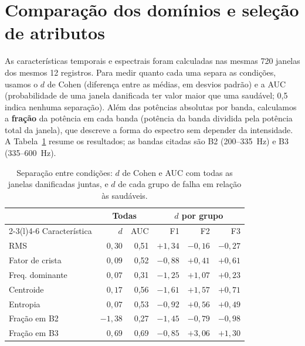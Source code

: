 
\section{Comparação dos domínios e seleção de atributos}
As características temporais e espectrais foram calculadas nas mesmas 720 janelas dos mesmos 12 registros. Para medir quanto cada uma separa as condições, usamos o $d$ de Cohen (diferença entre as médias, em desvios padrão) e a AUC (probabilidade de uma janela danificada ter valor maior que uma saudável; 0,5 indica nenhuma separação). Além das potências absolutas por banda, calculamos a \textbf{fração} da potência em cada banda (potência da banda dividida pela potência total da janela), que descreve a forma do espectro sem depender da intensidade. A Tabela~\ref{tab:comp} resume os resultados; as bandas citadas são B2 (200--335~Hz) e B3 (335--600~Hz).

\begin{table}[!t]
\caption{Separação entre condições: $d$ de Cohen e AUC com todas as janelas danificadas juntas, e $d$ de cada grupo de falha em relação às saudáveis.}
\label{tab:comp}\centering\small\setlength{\tabcolsep}{3.5pt}
\begin{tabular}{@{}lrrrrr@{}}\toprule
 & \multicolumn{2}{c}{Todas} & \multicolumn{3}{c}{$d$ por grupo}\\\cmidrule(lr){2-3}\cmidrule(l){4-6}
Característica & $d$ & AUC & F1 & F2 & F3\\\midrule
RMS & $0{,}30$ & 0,51 & $+1{,}34$ & $-0{,}16$ & $-0{,}27$\\
Fator de crista & $0{,}09$ & 0,52 & $-0{,}88$ & $+0{,}41$ & $+0{,}61$\\\midrule
Freq. dominante & $0{,}07$ & 0,31 & $-1{,}25$ & $+1{,}07$ & $+0{,}23$\\
Centroide & $0{,}17$ & 0,56 & $-1{,}61$ & $+1{,}57$ & $+0{,}71$\\
Entropia & $0{,}07$ & 0,53 & $-0{,}92$ & $+0{,}56$ & $+0{,}49$\\
Fração em B2 & $-1{,}38$ & 0,27 & $-1{,}45$ & $-0{,}79$ & $-0{,}98$\\
Fração em B3 & $0{,}69$ & 0,69 & $-0{,}85$ & $+3{,}06$ & $+1{,}30$\\\bottomrule
\end{tabular}
\end{table}

